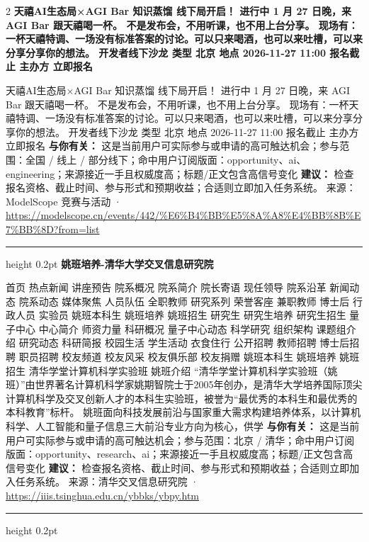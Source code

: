 \documentclass[10.5pt]{ctexart}
\begin{document}
\begin{multicols}{2}
{\large\bfseries 天禧AI生态局×AGI Bar 知识蒸馏 线下局开启！ 进行中 1 月 27 日晚，来 AGI Bar 跟天禧喝一杯。 不是发布会，不用听课，也不用上台分享。 现场有：一杯天禧特调、一场没有标准答案的讨论。可以只来喝酒，也可以来吐槽，可以来分享分享你的想法。 开发者线下沙龙 类型 北京 地点 2026-11-27 11:00 报名截止 主办方 立即报名}\par
天禧AI生态局×AGI Bar 知识蒸馏 线下局开启！ 进行中 1 月 27 日晚，来 AGI Bar 跟天禧喝一杯。 不是发布会，不用听课，也不用上台分享。 现场有：一杯天禧特调、一场没有标准答案的讨论。可以只来喝酒，也可以来吐槽，可以来分享分享你的想法。 开发者线下沙龙 类型 北京 地点 2026-11-27 11:00 报名截止 主办方 立即报名
\textbf{与你有关：} 这是当前用户可实际参与或申请的高可触达机会；参与范围：全国 / 线上 / 部分线下；命中用户订阅版面：opportunity、ai、engineering；来源接近一手且权威度高；标题/正文包含高信号变化
\textbf{建议：} 检查报名资格、截止时间、参与形式和预期收益；合适则立即加入任务系统。
{\footnotesize\color{ormuted} 来源：ModelScope 竞赛与活动 · \url{https://modelscope.cn/events/442/%E6%B4%BB%E5%8A%A8%E4%BB%8B%E7%BB%8D?from=list}}
\vspace{2mm}
\hrule height 0.2pt
\vspace{2mm}
{\large\bfseries 姚班培养-清华大学交叉信息研究院}\par
首页 热点新闻 讲座预告 院系概况 院系简介 院长寄语 现任领导 院系沿革 新闻动态 院系动态 媒体聚焦 人员队伍 全职教师 研究系列 荣誉客座 兼职教师 博士后 行政人员 实验员 姚班本科生 姚班培养 姚班招生 研究生 研究生培养 研究生招生 量子中心 中心简介 师资力量 科研概况 量子中心动态 科学研究 组织架构 课题组介绍 研究动态 科研简报 校园生活 学生活动 衣食住行 公开招聘 教师招聘 博士后招聘 职员招聘 校友频道 校友风采 校友俱乐部 校友捐赠 姚班本科生 姚班培养 姚班招生 清华学堂计算机科学实验班 姚班介绍 “清华学堂计算机科学实验班（姚班）”由世界著名计算机科学家姚期智院士于2005年创办，是清华大学培养国际顶尖计算机科学及交叉创新人才的本科生实验班，被誉为“最优秀的本科生和最优秀的本科教育”标杆。 姚班面向科技发展前沿与国家重大需求构建培养体系，以计算机科学、人工智能和量子信息三大前沿专业方向为核心，供学
\textbf{与你有关：} 这是当前用户可实际参与或申请的高可触达机会；参与范围：北京 / 清华；命中用户订阅版面：opportunity、research、ai；来源接近一手且权威度高；标题/正文包含高信号变化
\textbf{建议：} 检查报名资格、截止时间、参与形式和预期收益；合适则立即加入任务系统。
{\footnotesize\color{ormuted} 来源：清华交叉信息研究院 · \url{https://iiis.tsinghua.edu.cn/ybbks/ybpy.htm}}
\vspace{2mm}
\hrule height 0.2pt
\vspace{2mm}

\end{multicols}
\end{document}

